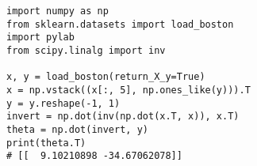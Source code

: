 \lstset{language=Python}
\begin{lstlisting}[caption={波士顿房价问题的解析解法\label{code:boston_house_price_solve1}}]
import numpy as np
from sklearn.datasets import load_boston
import pylab
from scipy.linalg import inv

x, y = load_boston(return_X_y=True)
x = np.vstack((x[:, 5], np.ones_like(y))).T
y = y.reshape(-1, 1)
invert = np.dot(inv(np.dot(x.T, x)), x.T)
theta = np.dot(invert, y)
print(theta.T)
# [[  9.10210898 -34.67062078]]
\end{lstlisting}